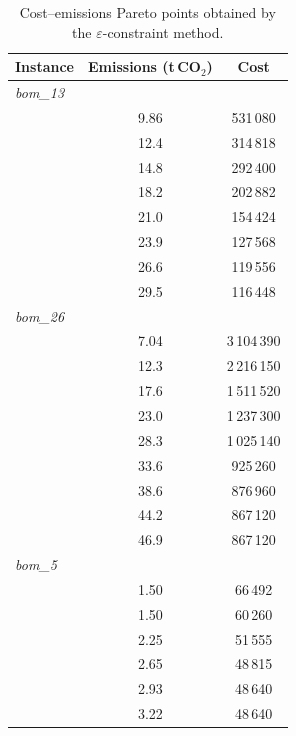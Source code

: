 \begin{table}[!htbp]\centering\small
\caption{Cost--emissions Pareto points obtained by the $\varepsilon$-constraint method.}\label{tab:paretoemis}
\begin{tabular}{lcc}
\toprule
Instance & Emissions (t\,CO$_2$) & Cost\\
\midrule
\multicolumn{3}{l}{\textit{bom\_13}} \\
 & 9.86 & 531\,080 \\
 & 12.4 & 314\,818 \\
 & 14.8 & 292\,400 \\
 & 18.2 & 202\,882 \\
 & 21.0 & 154\,424 \\
 & 23.9 & 127\,568 \\
 & 26.6 & 119\,556 \\
 & 29.5 & 116\,448 \\
\midrule
\multicolumn{3}{l}{\textit{bom\_26}} \\
 & 7.04 & 3\,104\,390 \\
 & 12.3 & 2\,216\,150 \\
 & 17.6 & 1\,511\,520 \\
 & 23.0 & 1\,237\,300 \\
 & 28.3 & 1\,025\,140 \\
 & 33.6 & 925\,260 \\
 & 38.6 & 876\,960 \\
 & 44.2 & 867\,120 \\
 & 46.9 & 867\,120 \\
\midrule
\multicolumn{3}{l}{\textit{bom\_5}} \\
 & 1.50 & 66\,492 \\
 & 1.50 & 60\,260 \\
 & 2.25 & 51\,555 \\
 & 2.65 & 48\,815 \\
 & 2.93 & 48\,640 \\
 & 3.22 & 48\,640 \\
\bottomrule
\end{tabular}
\end{table}
